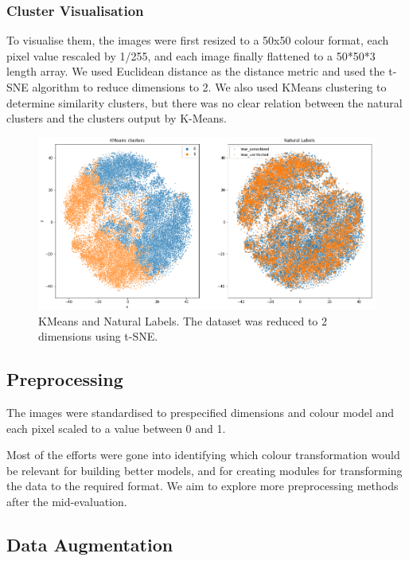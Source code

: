 \documentclass[10pt,twocolumn,letterpaper]{article}
\begin{document}
\subsubsection{Cluster Visualisation}
To visualise them, the images were first resized to a 50x50 colour format, each pixel value rescaled by 1/255, and each image finally flattened to a 50*50*3 length array. We used Euclidean distance as the distance metric and used the t-SNE algorithm to reduce dimensions to 2. We also used KMeans clustering to determine similarity clusters, but there was no clear relation between the natural clusters and the clusters output by K-Means. 

\begin{figure}[t]
   \begin{center}
      \includegraphics[width=1\linewidth]{../Plots/kmeans_natural labels.png}
   \end{center}
      \caption{KMeans and Natural Labels. The dataset was reduced to 2 dimensions using t-SNE.}
   \label{fig:tsne_vis}
\end{figure}

\subsection{Preprocessing}
The images were standardised to prespecified dimensions and colour model and each pixel scaled to a value between 0 and 1. 

Most of the efforts were gone into identifying which colour transformation would be relevant for building better models, and for creating modules for transforming the data to the required format. We aim to explore more preprocessing methods after the mid-evaluation.

\subsection{Data Augmentation}
\end{document}
